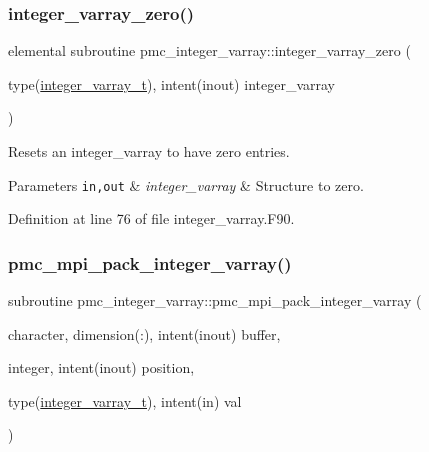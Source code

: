 \subsubsection{\texorpdfstring{integer\+\_\+varray\+\_\+zero()}{integer\_varray\_zero()}}
{\footnotesize\ttfamily elemental subroutine pmc\+\_\+integer\+\_\+varray\+::integer\+\_\+varray\+\_\+zero (\begin{DoxyParamCaption}\item[{type(\mbox{\hyperlink{structpmc__integer__varray_1_1integer__varray__t}{integer\+\_\+varray\+\_\+t}}), intent(inout)}]{integer\+\_\+varray }\end{DoxyParamCaption})}



Resets an integer\+\_\+varray to have zero entries. 


\begin{DoxyParams}[1]{Parameters}
\mbox{\tt in,out}  & {\em integer\+\_\+varray} & Structure to zero. \\
\hline
\end{DoxyParams}


Definition at line 76 of file integer\+\_\+varray.\+F90.

\mbox{\label{namespacepmc__integer__varray_a4983f303a12ec1ff340ff2f2b738ed4d}} 
\subsubsection{\texorpdfstring{pmc\+\_\+mpi\+\_\+pack\+\_\+integer\+\_\+varray()}{pmc\_mpi\_pack\_integer\_varray()}}
{\footnotesize\ttfamily subroutine pmc\+\_\+integer\+\_\+varray\+::pmc\+\_\+mpi\+\_\+pack\+\_\+integer\+\_\+varray (\begin{DoxyParamCaption}\item[{character, dimension(\+:), intent(inout)}]{buffer,  }\item[{integer, intent(inout)}]{position,  }\item[{type(\mbox{\hyperlink{structpmc__integer__varray_1_1integer__varray__t}{integer\+\_\+varray\+\_\+t}}), intent(in)}]{val }\end{DoxyParamCaption})}




